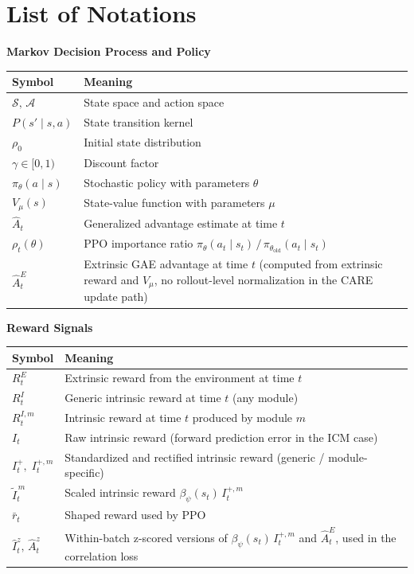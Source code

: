 \chapter*{List of Notations}
{}

\renewcommand{\arraystretch}{1.2}

\textbf{Markov Decision Process and Policy}

\begin{tabular}{|m{2.8cm}|m{11.3cm}|}
\hline
\textbf{Symbol} & \textbf{Meaning} \\
\hline
$\mathcal{S},\,\mathcal{A}$ & State space and action space \\
\hline
$P(s' \mid s, a)$ & State transition kernel \\
\hline
$\rho_0$ & Initial state distribution \\
\hline
$\gamma \in [0,1)$ & Discount factor \\
\hline
$\pi_\theta(a \mid s)$ & Stochastic policy with parameters $\theta$ \\
\hline
$V_\mu(s)$ & State-value function with parameters $\mu$ \\
\hline
$\hat A_t$ & Generalized advantage estimate at time $t$ \\
\hline
$\rho_t(\theta)$ & PPO importance ratio $\pi_\theta(a_t \mid s_t)\,/\,\pi_{\theta_\text{old}}(a_t \mid s_t)$ \\
\hline
$\hat A_t^{E}$ & Extrinsic GAE advantage at time $t$ (computed from extrinsic reward and $V_\mu$, no rollout-level normalization in the CARE update path) \\
\hline
\end{tabular}

\vspace{0.8em}

\textbf{Reward Signals}

\begin{tabular}{|m{2.8cm}|m{11.3cm}|}
\hline
\textbf{Symbol} & \textbf{Meaning} \\
\hline
$R^E_t$ & Extrinsic reward from the environment at time $t$ \\
\hline
$R^I_t$ & Generic intrinsic reward at time $t$ (any module) \\
\hline
$R^{I,m}_t$ & Intrinsic reward at time $t$ produced by module $m$ \\
\hline
$I_t$ & Raw intrinsic reward (forward prediction error in the ICM case) \\
\hline
$I^+_t,\; I^{+,m}_t$ & Standardized and rectified intrinsic reward (generic / module-specific) \\
\hline
$\tilde I^{\,m}_t$ & Scaled intrinsic reward $\beta_\psi(s_t)\, I^{+,m}_t$ \\
\hline
$\bar r_t$ & Shaped reward used by PPO \\
\hline
$\hat I_t^{z},\, \hat A_t^{z}$ & Within-batch z-scored versions of $\beta_\psi(s_t)\, I_t^{+,m}$ and $\hat A_t^{E}$, used in the correlation loss \\
\hline
\end{tabular}

